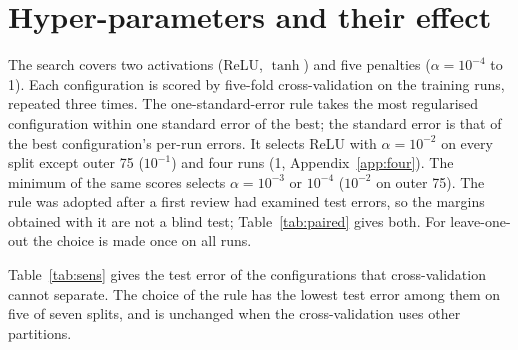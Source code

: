 \documentclass[11pt,a4paper]{article}
\begin{document}
\appendix

\section{Hyper-parameters and their effect}
\label{app:selection}

The search covers two activations (ReLU, $\tanh$) and five penalties ($\alpha = 10^{-4}$ to 1). Each
configuration is scored by five-fold cross-validation on the training runs, repeated three times. The
one-standard-error rule takes the most regularised configuration within one standard error of the best; the
standard error is that of the best configuration's per-run errors. It selects ReLU with $\alpha = 10^{-2}$ on
every split except outer 75 ($10^{-1}$) and four runs (1, Appendix~\ref{app:four}). The minimum of the same scores selects $\alpha = 10^{-3}$ or $10^{-4}$
($10^{-2}$ on outer 75). The rule was adopted after a first review had examined test errors, so the margins
obtained with it are not a blind test; Table~\ref{tab:paired} gives both. For leave-one-out the choice is made
once on all runs.

Table~\ref{tab:sens} gives the test error of the configurations that cross-validation cannot separate. The choice
of the rule has the lowest test error among them on five of seven splits, and is unchanged when the
cross-validation uses other partitions.

\begin{table}[H]
\centering\footnotesize\setlength{\tabcolsep}{3pt}

\caption{Network minus GP on $s$, per held-out run (K; negative: network better): mean, 95\,\% bootstrap interval,
Wilcoxon signed-rank $p$ and Holm-corrected $p$ over the eight splits. Left: the reported network. Right: the
network chosen by the minimum cross-validation error (its $\alpha$ and mean RMSE). The tests treat runs as
independent and are therefore optimistic.}
\label{tab:paired}
\end{table}

\begin{table}[H]
\centering\footnotesize\setlength{\tabcolsep}{3pt}

\caption{Configurations within one standard error of the best cross-validation score: their number, the range of
their test RMSE (K), how many beat the GP on $s$, and the rank of the rule's choice among them. All ten: range over
the whole search. Right: the choice of each rule with other cross-validation partitions.}
\label{tab:sens}
\end{table}
\end{document}
